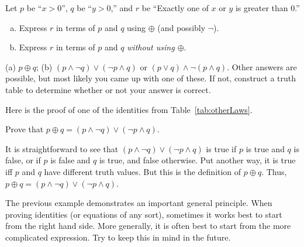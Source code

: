 \begin{exer}
Let $p$ be ``$x>0$'',  $q$ be ``$y>0$,''
and $r$ be ``Exactly one of $x$ or $y$ is greater than 0.''
\begin{enumerate}[(a)]
\item
Express $r$ in terms of $p$ and $q$ using $\oplus$ (and possibly $\neg$).\\
\answerline
\item
Express $r$ in terms of $p$ and $q$ {\em without using $\oplus$}.\\
\answerline
\end{enumerate}
\begin{answer}
(a) $p\oplus q$; 
(b) $(p\wedge \neg q)\vee(\neg p\wedge q)$ or $(p\vee q)\wedge \neg(p\wedge q)$.
Other answers are possible, but most likely you came up with one of these.  
If not, construct a truth table to determine whether or not your answer is correct.
\end{answer}
\end{exer}

Here is the proof of one of the identities from Table~\ref{tab:otherLaws}.

\begin{exa}\label{exa:oplusIdentity}
Prove that $p\oplus q = (p \wedge \neg q) \vee (\neg p \wedge q)$.
\begin{sol}
It is straightforward to see that $(p \wedge \neg q) \vee (\neg p \wedge q)$ is true if
$p$ is true and $q$ is false, or if $p$ is false and $q$ is true, and false otherwise.
Put another way, it is true iff $p$ and $q$ have different truth values. 
But this is the definition of $p\oplus q$.  
Thus, $p\oplus q = (p \wedge \neg q) \vee (\neg p \wedge q)$.
\end{sol}
\end{exa}

The previous example demonstrates an important general principle.
When proving identities (or equations of any sort), sometimes it works best to start from the right hand side.  
More generally, it is often best to start from the more complicated
expression.
Try to keep this in mind in the future.

\newpage

